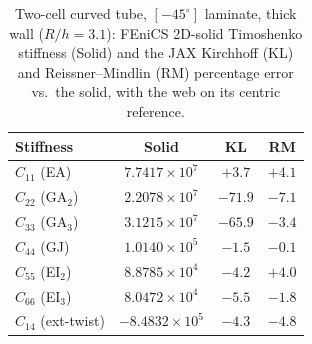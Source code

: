 \begin{table}[htpb]
\centering
\caption{Two-cell curved tube, $[-45^\circ]$ laminate, thick wall ($R/h = 3.1$): FEniCS 2D-solid Timoshenko stiffness (Solid) and the JAX Kirchhoff (KL) and Reissner--Mindlin (RM) percentage error vs.\ the solid, with the web on its centric reference.}
\label{tab:mc2_aniso_thick}
\begin{tabular}{lccc}
\hline
Stiffness & Solid & KL & RM \\
\hline
$C_{11}$ (EA) & $7.7417{\times}10^{7}$ & $+3.7$ & $+4.1$ \\
$C_{22}$ (GA$_2$) & $2.2078{\times}10^{7}$ & $-71.9$ & $-7.1$ \\
$C_{33}$ (GA$_3$) & $3.1215{\times}10^{7}$ & $-65.9$ & $-3.4$ \\
$C_{44}$ (GJ) & $1.0140{\times}10^{5}$ & $-1.5$ & $-0.1$ \\
$C_{55}$ (EI$_2$) & $8.8785{\times}10^{4}$ & $-4.2$ & $+4.0$ \\
$C_{66}$ (EI$_3$) & $8.0472{\times}10^{4}$ & $-5.5$ & $-1.8$ \\
$C_{14}$ (ext-twist) & $-8.4832{\times}10^{5}$ & $-4.3$ & $-4.8$ \\
\hline
\end{tabular}
\end{table}

